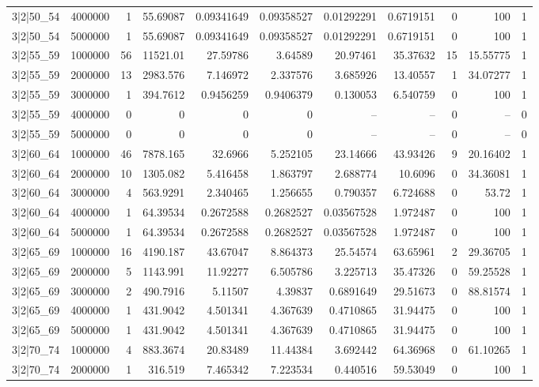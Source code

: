 \begin{tabular}{lrrrrrrrrrr}
3|2|50\_54 & 4000000 & 1 & 55.69087 & 0.09341649 & 0.09358527 & 0.01292291 & 0.6719151 & 0 & 100 & 1 \\
3|2|50\_54 & 5000000 & 1 & 55.69087 & 0.09341649 & 0.09358527 & 0.01292291 & 0.6719151 & 0 & 100 & 1 \\
3|2|55\_59 & 1000000 & 56 & 11521.01 & 27.59786 & 3.64589 & 20.97461 & 35.37632 & 15 & 15.55775 & 1 \\
3|2|55\_59 & 2000000 & 13 & 2983.576 & 7.146972 & 2.337576 & 3.685926 & 13.40557 & 1 & 34.07277 & 1 \\
3|2|55\_59 & 3000000 & 1 & 394.7612 & 0.9456259 & 0.9406379 & 0.130053 & 6.540759 & 0 & 100 & 1 \\
3|2|55\_59 & 4000000 & 0 & 0 & 0 & 0 & -- & -- & 0 & -- & 0 \\
3|2|55\_59 & 5000000 & 0 & 0 & 0 & 0 & -- & -- & 0 & -- & 0 \\
3|2|60\_64 & 1000000 & 46 & 7878.165 & 32.6966 & 5.252105 & 23.14666 & 43.93426 & 9 & 20.16402 & 1 \\
3|2|60\_64 & 2000000 & 10 & 1305.082 & 5.416458 & 1.863797 & 2.688774 & 10.6096 & 0 & 34.36081 & 1 \\
3|2|60\_64 & 3000000 & 4 & 563.9291 & 2.340465 & 1.256655 & 0.790357 & 6.724688 & 0 & 53.72 & 1 \\
3|2|60\_64 & 4000000 & 1 & 64.39534 & 0.2672588 & 0.2682527 & 0.03567528 & 1.972487 & 0 & 100 & 1 \\
3|2|60\_64 & 5000000 & 1 & 64.39534 & 0.2672588 & 0.2682527 & 0.03567528 & 1.972487 & 0 & 100 & 1 \\
3|2|65\_69 & 1000000 & 16 & 4190.187 & 43.67047 & 8.864373 & 25.54574 & 63.65961 & 2 & 29.36705 & 1 \\
3|2|65\_69 & 2000000 & 5 & 1143.991 & 11.92277 & 6.505786 & 3.225713 & 35.47326 & 0 & 59.25528 & 1 \\
3|2|65\_69 & 3000000 & 2 & 490.7916 & 5.11507 & 4.39837 & 0.6891649 & 29.51673 & 0 & 88.81574 & 1 \\
3|2|65\_69 & 4000000 & 1 & 431.9042 & 4.501341 & 4.367639 & 0.4710865 & 31.94475 & 0 & 100 & 1 \\
3|2|65\_69 & 5000000 & 1 & 431.9042 & 4.501341 & 4.367639 & 0.4710865 & 31.94475 & 0 & 100 & 1 \\
3|2|70\_74 & 1000000 & 4 & 883.3674 & 20.83489 & 11.44384 & 3.692442 & 64.36968 & 0 & 61.10265 & 1 \\
3|2|70\_74 & 2000000 & 1 & 316.519 & 7.465342 & 7.223534 & 0.440516 & 59.53049 & 0 & 100 & 1 \\

\end{tabular}
